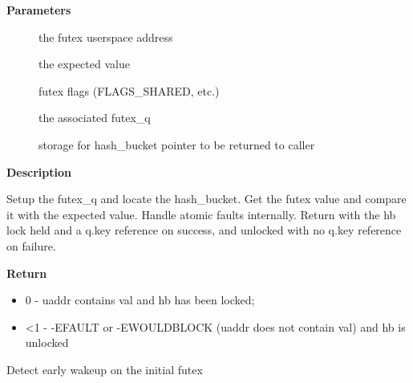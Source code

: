 \documentclass[a4paper,8pt,english]{sphinxmanual}
\begin{document}
\textbf{Parameters}
\begin{description}
\item[{}] \leavevmode
the futex userspace address

\item[{}] \leavevmode
the expected value

\item[{}] \leavevmode
futex flags (FLAGS\_SHARED, etc.)

\item[{}] \leavevmode
the associated futex\_q

\item[{}] \leavevmode
storage for hash\_bucket pointer to be returned to caller

\end{description}

\textbf{Description}

Setup the futex\_q and locate the hash\_bucket.  Get the futex value and
compare it with the expected value.  Handle atomic faults internally.
Return with the hb lock held and a q.key reference on success, and unlocked
with no q.key reference on failure.

\textbf{Return}
\begin{itemize}
\item {} 
0 - uaddr contains val and hb has been locked;

\item {} 
\textless{}1 - -EFAULT or -EWOULDBLOCK (uaddr does not contain val) and hb is unlocked

\end{itemize}

\begin{fulllineitems}
\label{kernel-hacking/locking:c.handle_early_requeue_pi_wakeup}
Detect early wakeup on the initial futex

\end{fulllineitems}
\end{document}
